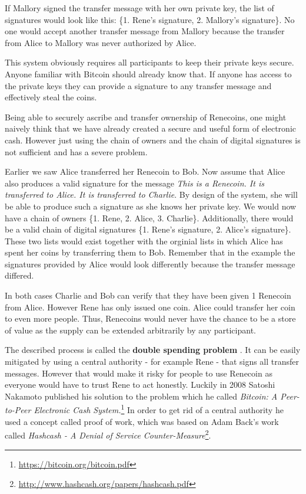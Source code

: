 \documentclass[a4paper,12pt,oneside,openany]{book}
\begin{document}
If Mallory signed the transfer message with her own private key, the list of signatures would look like this: \{1. Rene's signature, 2. Mallory's signature\}.
No one would accept another transfer message from Mallory because the transfer from Alice to Mallory was never authorized by Alice.

This system obviously requires all participants to keep their private keys secure.
Anyone familiar with Bitcoin should already know that.
If anyone has access to the private keys they can provide a signature to any transfer message and effectively steal the coins. 

Being able to securely ascribe and transfer ownership of Renecoins, one might naively think that we have already created a secure and useful form of electronic cash.
However just using the chain of owners and the chain of digital signatures is not sufficient and has a severe problem. 

Earlier we saw Alice transferred her Renecoin to Bob. Now assume that Alice also produces a valid signature for the message \textit{This is a Renecoin. It is transferred to Alice. It is transferred to Charlie}.
By design of the system, she will be able to produce such a signature as she knows her private key.
We would now have a chain of owners  \{1. Rene, 2. Alice, 3. Charlie\}.
Additionally, there would be a valid chain of digital signatures \{1. Rene's signature, 2. Alice's signature\}.
These two lists would exist together with the orginial lists in which Alice has spent her coins by transferring them to Bob.
Remember that in the example  the signatures provided by Alice would look differently because the transfer message differed.

In both cases Charlie and Bob can verify that they have been given 1 Renecoin from Alice.
However Rene has only issued one coin.
Alice could transfer her coin to even more people.
Thus, Renecoins would never have the chance to be a store of value as the supply can be extended arbitrarily by any participant.

The described process is called the \textbf{double spending problem} .
It can be easily mitigated by using a central authority - for example Rene - that signs all transfer messages.
However that would make it risky for people to use Renecoin as everyone would have to trust Rene to act honestly.
Luckily in 2008 Satoshi Nakamoto published his solution to the problem which he called \textit{Bitcoin: A Peer-to-Peer Electronic Cash System.}\footnote{\url{https://bitcoin.org/bitcoin.pdf}}
In order to get rid of a central authority he used a concept called proof of work, which was based on Adam Back's work called \textit{Hashcash - A Denial of Service Counter-Measure}\footnote{\url{http://www.hashcash.org/papers/hashcash.pdf}}.
\end{document}
